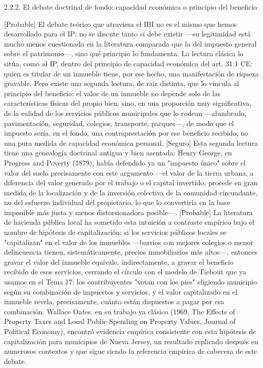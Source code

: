 \documentclass[10pt,a4paper]{article}
\begin{document}
2.2.2. El debate doctrinal de fondo: capacidad económica o principio del beneficio

[Probable] El debate teórico que atraviesa el IBI no es el mismo que hemos desarrollado para el IP: no se discute tanto si debe existir —su legitimidad está mucho menos cuestionada en la literatura comparada que la del impuesto general sobre el patrimonio—, sino qué principio lo fundamenta. La lectura clásica lo sitúa, como al IP, dentro del principio de capacidad económica del art. 31.1 CE: quien es titular de un inmueble tiene, por ese hecho, una manifestación de riqueza gravable. Pero existe una segunda lectura, de raíz distinta, que lo vincula al principio del beneficio: el valor de un inmueble no depende solo de las características físicas del propio bien, sino, en una proporción muy significativa, de la calidad de los servicios públicos municipales que lo rodean —alumbrado, pavimentación, seguridad, colegios, transporte, parques—, de modo que el impuesto sería, en el fondo, una contraprestación por ese beneficio recibido, no una pura medida de capacidad económica personal. [Seguro] Esta segunda lectura tiene una genealogía doctrinal antigua y bien asentada: Henry George, en Progress and Poverty (1879), había defendido ya un "impuesto único" sobre el valor del suelo precisamente con este argumento —el valor de la tierra urbana, a diferencia del valor generado por el trabajo o el capital invertido, procede en gran medida de la localización y de la inversión colectiva de la comunidad circundante, no del esfuerzo individual del propietario, lo que lo convertiría en la base imponible más justa y menos distorsionadora posible—. [Probable] La literatura de hacienda pública local ha sometido esta intuición a contraste empírico bajo el nombre de hipótesis de capitalización: si los servicios públicos locales se "capitalizan" en el valor de los inmuebles —barrios con mejores colegios o menor delincuencia tienen, sistemáticamente, precios inmobiliarios más altos—, entonces gravar el valor del inmueble equivale, indirectamente, a gravar el beneficio recibido de esos servicios, cerrando el círculo con el modelo de Tiebout que ya usamos en el Tema 17: los contribuyentes "votan con los pies" eligiendo municipio según su combinación de impuestos y servicios, y el valor capitalizado en el inmueble revela, precisamente, cuánto están dispuestos a pagar por esa combinación. Wallace Oates, en su trabajo ya clásico (1969, The Effects of Property Taxes and Local Public Spending on Property Values, Journal of Political Economy), encontró evidencia empírica consistente con esta hipótesis de capitalización para municipios de Nueva Jersey, un resultado replicado después en numerosos contextos y que sigue siendo la referencia empírica de cabecera de este debate.
\end{document}
